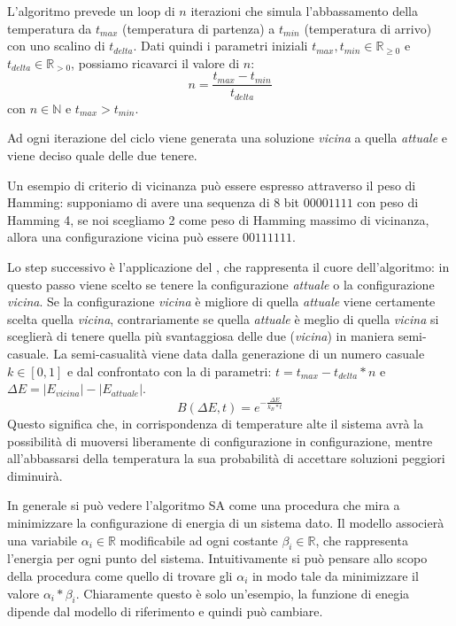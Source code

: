 L'algoritmo prevede un loop di $n$ iterazioni che simula l'abbassamento della temperatura da $t_{max}$ (temperatura di partenza) a $t_{min}$ (temperatura di arrivo) con uno scalino di $t_{delta}$. Dati quindi i parametri iniziali $t_{max}, t_{min} \in \mathbb{R}_{\geq 0}$ e $ t_{delta} \in \mathbb{R}_{> 0}$, possiamo ricavarci il valore di $n$:
$$n = \frac{t_{max}-t_{min}}{t_{delta}}$$
con $n \in \mathbb{N}$ e $t_{max} > t_{min}$.

Ad ogni iterazione del ciclo viene generata una soluzione \textit{vicina} a quella \textit{attuale} e viene deciso quale delle due tenere.

Un esempio di criterio di vicinanza può essere espresso attraverso il peso di Hamming: supponiamo di avere una sequenza di 8 bit $00001111$ con peso di Hamming 4, se noi scegliamo 2 come peso di Hamming massimo di vicinanza, allora una configurazione vicina può essere $00111111$.

Lo step successivo è l'applicazione del , che rappresenta il cuore dell'algoritmo: in questo passo viene scelto se tenere la configurazione \textit{attuale} o la configurazione \textit{vicina}. Se la configurazione \textit{vicina} è migliore di quella \textit{attuale} viene certamente scelta quella \textit{vicina}, contrariamente se quella \textit{attuale} è meglio di quella \textit{vicina} si sceglierà di tenere quella più svantaggiosa delle due (\textit{vicina}) in maniera semi-casuale.
La semi-casualità viene data dalla generazione di un numero casuale $k \in [0,1]$ e dal confrontato con la  di parametri: $t = t_{max} - t_{delta} * n$ e $\Delta E = |E_{vicina}| - |E_{attuale}|$.
$$B(\Delta E, t) = e^{- \frac{\Delta E}{k_B * t}}$$
Questo significa che, in corrispondenza di temperature alte il sistema avrà la possibilità di muoversi liberamente di configurazione in configurazione, mentre all’abbassarsi della temperatura la sua probabilità di accettare soluzioni peggiori diminuirà.

In generale si può vedere l'algoritmo SA come una procedura che mira a minimizzare la configurazione di energia di un sistema dato. Il modello associerà una variabile $\alpha_i \in \mathbb{R}$ modificabile ad ogni costante $\beta_i \in \mathbb{R}$, che rappresenta l'energia per ogni punto del sistema. Intuitivamente si può pensare allo scopo della procedura come quello di trovare gli $\alpha_i$ in modo tale da minimizzare il valore $\alpha_i * \beta_i$. Chiaramente questo è solo un'esempio, la funzione di enegia dipende dal modello di riferimento e quindi può cambiare.

